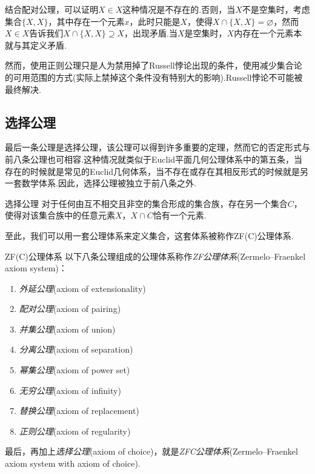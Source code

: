 结合配对公理，可以证明$X \in X$这种情况是不存在的.否则，当$X$不是空集时，考虑集合$\{ X,X \}$，其中存在一个元素$x$，此时只能是$X$，使得$X \cap \{ X,X \}=\varnothing$，然而$X \in X$告诉我们$X \cap \{ X,X \} \supseteq X$，出现矛盾.当$X$是空集时，$X$内存在一个元素本就与其定义矛盾.

然而，使用正则公理只是人为禁用掉了Russell悖论出现的条件，使用减少集合论的可用范围的方式(实际上禁掉这个条件没有特别大的影响).Russell悖论不可能被最终解决.

\subsection{选择公理}

最后一条公理是选择公理，该公理可以得到许多重要的定理，然而它的否定形式与前八条公理也可相容.这种情况就类似于Euclid平面几何公理体系中的第五条，当存在的时候就是常见的Euclid几何体系，当不存在或存在其相反形式的时候就是另一套数学体系.因此，选择公理被独立于前八条之外.

\begin{axiom}{选择公理}
	对于任何由互不相交且非空的集合形成的集合族，存在另一个集合$C$，使得对该集合族中的任意元素$X$，$X \cap C$恰有一个元素.
\end{axiom}

至此，我们可以用一套公理体系来定义集合，这套体系被称作ZF(C)公理体系.

\begin{definition}{ZF(C)公理体系}
	以下八条公理组成的公理体系称作\textit{ZF公理体系}(Zermelo–Fraenkel axiom system)：
	\begin{enumerate}
		\item \textit{外延公理}(axiom of extensionality)
		\item \textit{配对公理}(axiom of pairing)
		\item \textit{并集公理}(axiom of union)
		\item \textit{分离公理}(axiom of separation)
		\item \textit{幂集公理}(axiom of power set)
		\item \textit{无穷公理}(axiom of infinity)
		\item \textit{替换公理}(axiom of replacement)
		\item \textit{正则公理}(axiom of regularity)
	\end{enumerate}
	最后，再加上\textit{选择公理}(axiom of choice)，就是\textit{ZFC公理体系}(Zermelo–Fraenkel axiom system with axiom of choice).
\end{definition}

